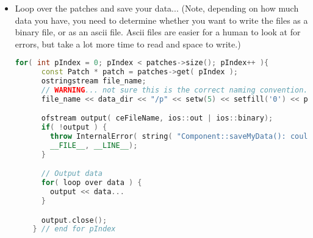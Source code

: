 \begin{itemize}
\item Loop over the patches and save your data... (Note, depending on
  how much data you have, you need to determine whether you want to
  write the files as a binary file, or as an ascii file.  Ascii files
  are easier for a human to look at for errors, but take a lot more
  time to read and space to write.)
  \begin{lstlisting}[language=Cpp]
    for( int pIndex = 0; pIndex < patches->size(); pIndex++ ){
      const Patch * patch = patches->get( pIndex );
      ostringstream file_name;
      // WARNING... not sure this is the correct naming convention... PLEASE VERIFY AND UPDATE THIS DOC.
      file_name << data_dir << "/p" << setw(5) << setfill('0') << pIndex;

      ofstream output( ceFileName, ios::out | ios::binary);
      if( !output ) {
        throw InternalError( string( "Component::saveMyData(): couldn't open file '") + file_name.str() + "'.",
        __FILE__, __LINE__);        
      }

      // Output data
      for( loop over data ) {
        output << data...
      }

      output.close();
    } // end for pIndex
  \end{lstlisting}

\end{itemize}
